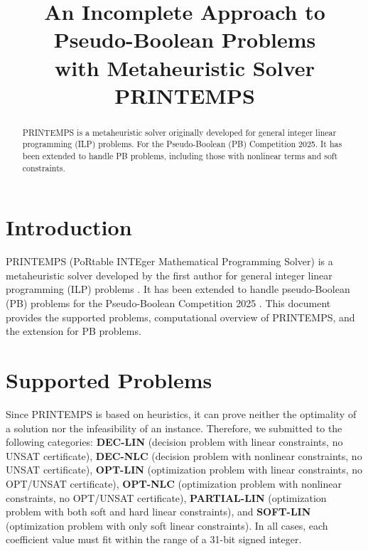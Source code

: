 \documentclass[conference]{IEEEtran}
\begin{document}
\title{\huge An Incomplete Approach to Pseudo-Boolean Problems \\with Metaheuristic Solver PRINTEMPS}

\author{
\and
{}
}

\maketitle

\begin{abstract}
PRINTEMPS is a metaheuristic solver originally developed for general integer linear programming (ILP) problems. For the Pseudo-Boolean (PB) Competition 2025. It has been extended to handle PB problems, including those with nonlinear terms and soft constraints.
\end{abstract}

\section{Introduction}
PRINTEMPS (PoRtable INTEger Mathematical Programming Solver) is a metaheuristic solver developed by the first author for general integer linear programming (ILP) problems \cite{printemps}.
It has been extended to handle pseudo-Boolean (PB) problems for the Pseudo-Boolean Competition 2025 \cite{pb25}.
This document provides the supported problems, computational overview of PRINTEMPS, and the extension for PB problems. 

\section{Supported Problems}
Since PRINTEMPS is based on heuristics, it can prove neither the optimality of a solution nor the infeasibility of an instance. 
Therefore, we submitted to the following categories: 
{\bf DEC-LIN} (decision problem with linear constraints, no UNSAT certificate),
{\bf DEC-NLC} (decision problem with nonlinear constraints, no UNSAT certificate),
{\bf OPT-LIN} (optimization problem with linear constraints, no OPT/UNSAT certificate),
{\bf OPT-NLC} (optimization problem with nonlinear constraints, no OPT/UNSAT certificate),
{\bf PARTIAL-LIN} (optimization problem with both soft and hard linear constraints), and 
{\bf SOFT-LIN} (optimization problem with only soft linear constraints).
In all cases, each coefficient value must fit within the range of a 31-bit signed integer. 
\end{document}
